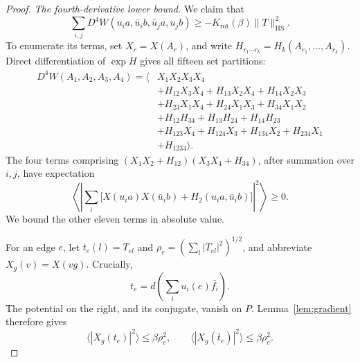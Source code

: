 \begin{proof}
\medskip\noindent
\emph{The fourth-derivative lower bound.}
We claim that
\begin{equation}
\label{eq:rotation-fourth-lower}
\sum_{i,j}D^4W(u_i a,\bar u_i b,\bar u_j a,u_j b)
\ge-K_{\mathrm{rot}}(\beta)\|T\|_{\mathrm{HS}}^2.
\end{equation}
To enumerate its terms, set \(X_r=X(A_r)\), and write
\(H_{r_1\cdots r_k}=H_k(A_{r_1},\ldots,A_{r_k})\). Direct
differentiation of \(\exp H\) gives all fifteen set partitions:
\begin{equation}
\label{eq:rotation-fifteen-terms}
\begin{aligned}
D^4W(A_1,A_2,A_3,A_4)=\bigl\langle
&X_1X_2X_3X_4\\
&+H_{12}X_3X_4+H_{13}X_2X_4+H_{14}X_2X_3\\
&+H_{23}X_1X_4+H_{24}X_1X_3+H_{34}X_1X_2\\
&+H_{12}H_{34}+H_{13}H_{24}+H_{14}H_{23}\\
&+H_{123}X_4+H_{124}X_3+H_{134}X_2+H_{234}X_1\\
&+H_{1234}\bigr\rangle.
\end{aligned}
\end{equation}
The four terms comprising
\((X_1X_2+H_{12})(X_3X_4+H_{34})\), after summation over \(i,j\),
have expectation
\begin{equation}
\label{eq:rotation-positive-square}
\left\langle\left|\sum_i
\bigl[X(u_i a)X(\bar u_i b)+H_2(u_i a,\bar u_i b)\bigr]
\right|^2\right\rangle\ge0.
\end{equation}
We bound the other eleven terms in absolute value.

For an edge \(e\), let \(t_e(l)=T_{el}\) and
\(\rho_e=(\sum_l|T_{el}|^2)^{1/2}\), and abbreviate
\(X_g(v)=X(vg)\). Crucially,
\begin{equation}
\label{eq:rotation-row-gradient}
t_e=d\left(\sum_i u_i(e)\overline{f_i}\right).
\end{equation}
The potential on the right, and its conjugate, vanish on \(P\).
Lemma~\ref{lem:gradient} therefore gives
\begin{equation}
\label{eq:rotation-row-bound}
\langle|X_g(t_e)|^2\rangle\le\beta\rho_e^2,
\qquad
\langle|X_g(\bar t_e)|^2\rangle\le\beta\rho_e^2.
\end{equation}


\end{proof}
